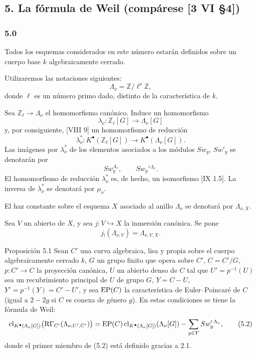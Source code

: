 \subsection*{5. La fórmula de Weil (compárese [3 VI §4])}

\subsubsection*{5.0}

Todos los esquemas considerados en este número estarán definidos sobre un cuerpo base $k$ algebraicamente cerrado.

Utilizaremos las notaciones siguientes:
\[
\Lambda_\nu=\mathbb Z/\ell^\nu\mathbb Z,
\]
donde $\ell$ es un número primo dado, distinto de la característica de $k$.

Sea $\mathbb Z_\ell\to\Lambda_\nu$ el homomorfismo canónico. Induce un homomorfismo
\[
\lambda_\nu:\mathbb Z_\ell[G]\longrightarrow \Lambda_\nu[G]
\]
y, por consiguiente, [VIII 9] un homomorfismo de reducción
\[
\lambda_\nu^*:K^{\bullet}(\mathbb Z_\ell[G])\longrightarrow K^{\bullet}(\Lambda_\nu[G]).
\]
Las imágenes por $\lambda_\nu^*$ de los elementos asociados a los módulos $Sw_y$, $Sw'_y$ se denotarán por
\[
Sw_y^{\Lambda_\nu},\qquad Sw_y'{}^{\Lambda_\nu}.
\]
El homomorfismo de reducción $\lambda_\nu^*$ es, de hecho, un isomorfismo [IX 1.5]. La inversa de $\lambda_\nu^*$ se denotará por $\mu_\nu$.

El haz constante sobre el esquema $X$ asociado al anillo $\Lambda_\nu$ se denotará por $\Lambda_{\nu,X}$.

Sea $V$ un abierto de $X$, y sea $j:V\hookrightarrow X$ la inmersión canónica. Se pone
\[
j_!(\Lambda_{\nu,V})=\Lambda_{\nu,V,X}.
\]

\begin{statement}{Proposición 5.1}
Sean $C'$ una curva algebraica, lisa y propia sobre el cuerpo algebraicamente cerrado $k$, $G$ un grupo finito que opera sobre $C'$, $C=C'/G$, $p:C'\to C$ la proyección canónica, $U$ un abierto denso de $C$ tal que $U'=p^{-1}(U)$ sea un recubrimiento principal de $U$ de grupo $G$, $Y=C-U$, $Y'=p^{-1}(Y)=C'-U'$, y sea $\operatorname{EP}(C)$ la característica de Euler--Poincaré de $C$ (igual a $2-2g$ si $C$ es conexa de género $g$).
En estas condiciones se tiene la fórmula de Weil:
\[
\operatorname{cl}_{K^{\bullet}(\Lambda_\nu[G])}\bigl(\mathrm R\Gamma_{C'}(\Lambda_{\nu,U',C'})\bigr)
=
\operatorname{EP}(C)\operatorname{cl}_{K^{\bullet}(\Lambda_\nu[G])}(\Lambda_\nu[G])
-\sum_{y\in Y}Sw_y'{}^{\Lambda_\nu},
\tag{5.2}
\]
donde el primer miembro de (5.2) está definido gracias a 2.1.
\end{statement}
